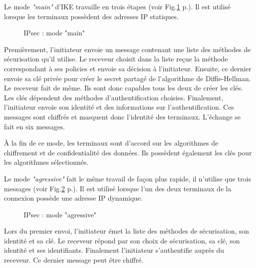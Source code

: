 Le mode \textit{"main"} d'IKE travaille en trois étapes (voir Fig.\ref{fig:ipsmain} p.\pageref{fig:ipsmain}).
Il est utilisé lorsque les terminaux possèdent des adresses IP statiques. 
\begin{figure}[ht]
\centering
{}
\caption{IPsec : mode "main"}
\label{fig:ipsmain}
\end{figure}
Premièrement, l'initiateur envoie un message contenant une liste des méthodes de sécurisation qu'il utilise. 
Le receveur choisit dans la liste reçue la méthode correspondant à ses policies et envoie sa décision à l'initiateur. 
Ensuite, ce dernier envoie sa clé privée pour créer le secret partagé de l'algorithme de Diffie-Hellman. 
Le receveur fait de même. Ils sont donc capables tous les deux de créer les clés. 
Les clés dépendent des méthodes d'authentification choisies. 
Finalement, l'initiateur envoie son identité et des informations sur l'authentification. 
Ces messages sont chiffrés et masquent donc l'identité des terminaux. 
L'échange se fait en six messages.

À la fin de ce mode, les terminaux sont d'accord sur les algorithmes de chiffrement et de confidentialité des données. 
Ils possèdent également les clés pour les algorithmes sélectionnés. 

Le mode \textit{"agressive"} fait le même travail de façon plus rapide, il n'utilise que trois messages (voir Fig.\ref{fig:ipsagg} p.\pageref{fig:ipsagg}).
Il est utilisé lorsque l'un des deux terminaux de la connexion possède une adresse IP dynamique.
\begin{figure}[ht]
\centering
{}
\caption{IPsec : mode "agressive"}
\label{fig:ipsagg}
\end{figure} 
Lors du premier envoi, l'initiateur émet la liste des méthodes de sécurisation, son identité et sa clé. 
Le receveur répond par son choix de sécurisation, sa clé, son identité et ses identifiants. 
Finalement l'initiateur s'authentifie auprès du receveur. 
Ce dernier message peut être chiffré.

